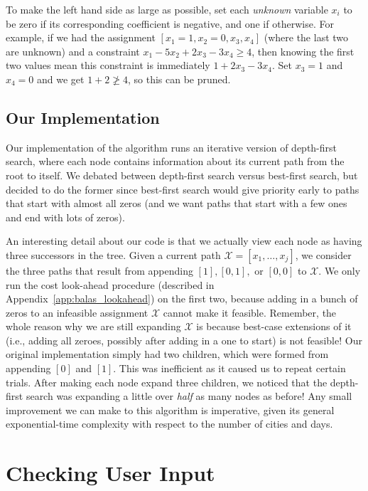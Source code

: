 \documentclass{article}
\begin{document}
To make the left hand side as large as possible, set each \emph{unknown} variable $x_i$ to be zero if its corresponding coefficient is negative, and
one if otherwise. For example, if we had the assignment $[x_1=1, x_2=0, x_3, x_4]$ (where the last two are unknown) and a constraint $x_1 - 5x_2 +
2x_3 -3x_4 \ge 4$, then knowing the first two values mean this constraint is immediately $1 + 2x_3 - 3x_4$. Set $x_3=1$ and $x_4=0$ and we get $1+2
\not \ge 4$, so this can be pruned.

\subsection{Our Implementation}

Our implementation of the algorithm runs an iterative version of depth-first search, where each node contains information about its current path from
the root to itself. We debated between depth-first search versus best-first search, but decided to do the former since best-first search would give
priority early to paths that start with almost all zeros (and we want paths that start with a few ones and end with lots of zeros).

An interesting detail about our code is that we actually view each node as having three successors in the tree. Given a current path $\mathcal{X} =
[x_1, \ldots, x_j]$, we consider the three paths that result from appending $[1],[0,1],$ or $[0,0]$ to $\mathcal{X}$. We only run the cost look-ahead
procedure (described in Appendix~\ref{app:balas_lookahead}) on the first two, because adding in a bunch of zeros to an infeasible assignment
$\mathcal{X}$ cannot make it feasible. Remember, the whole reason why we are still expanding $\mathcal{X}$ is because best-case extensions of it
(i.e., adding all zeroes, possibly after adding in a one to start) is not feasible! Our original implementation simply had two children, which were
formed from appending $[0]$ and $[1]$. This was inefficient as it caused us to repeat certain trials. After making each node expand three children, we
noticed that the depth-first search was expanding a little over \emph{half} as many nodes as before! Any small improvement we can make to this
algorithm is imperative, given its general exponential-time complexity with respect to the number of cities and days.

\section{Checking User Input}\label{app:input_check}
\end{document}

